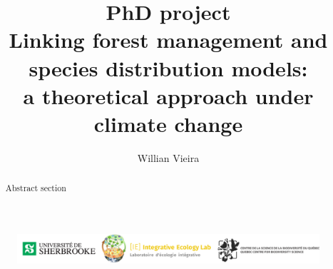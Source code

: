 


\title{
  PhD project \\
  Linking forest management and species distribution models: \\
  a theoretical approach under climate change
}

\author[1,*]{Willian Vieira}
\date{}



\maketitle

\begin{abstract}

Abstract section

\end{abstract}

\vfill
\begin{figure}
\centering\includegraphics[width=16cm]{img/logo.pdf}
\end{figure}

\thispagestyle{empty} %

\clearpage

\tableofcontents

\pagebreak
